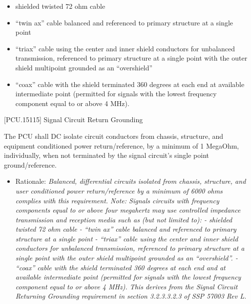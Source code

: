 \begin{itemize}
\item{} shielded twisted 72 ohm cable

\item{} ``twin ax'' cable balanced and referenced to primary structure at a single point

\item{} ``triax'' cable using the center and inner shield conductors for unbalanced transmission, referenced to primary structure at a single point with the outer shield multipoint grounded as an ``overshield''

\item{} ``coax'' cable with the shield terminated 360 degrees at each end at available intermediate point (permitted for signals with the lowest frequency component equal to or above 4 MHz).

\end{itemize}

[PCU.15115] Signal Circuit Return Grounding

The PCU shall DC isolate circuit conductors from chassis, structure, and equipment conditioned power return\slash reference, by a minimum of 1 MegaOhm, individually, when not terminated by the signal circuit's single point ground\slash reference.

\begin{itemize}
\item{} Rationale: \emph{Balanced, differential circuits isolated from chassis, structure, and user conditioned power return\slash reference by a minimum of 6000 ohms complies with this requirement. Note: Signals circuits with frequency components equal to or above four megahertz may use controlled impedance transmission and reception media such as (but not limited to): - shielded twisted 72 ohm cable - ``twin ax'' cable balanced and referenced to primary structure at a single point - ``triax'' cable using the center and inner shield conductors for unbalanced transmission, referenced to primary structure at a single point with the outer shield multipoint grounded as an ``overshield''. - ``coax'' cable with the shield terminated 360 degrees at each end and at available intermediate point (permitted for signals with the lowest frequency component equal to or above 4 MHz). This derives from the Signal Circuit Returning Grounding requirement in section 3.2.3.3.2.3 of SSP 57003 Rev L.}

\end{itemize}

